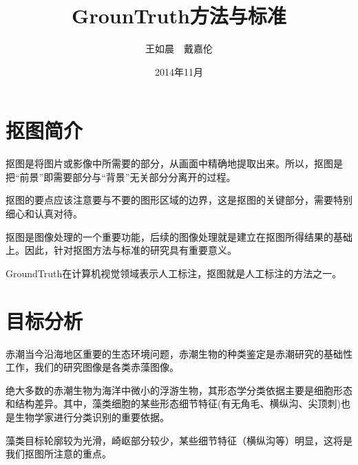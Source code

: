 \documentclass[12pt]{article}
\begin{document}
\title{\vspace{-2em}GrounTruth方法与标准\vspace{-0.7em}}
\author{王如晨　戴嘉伦}
\date{\vspace{-0.7em}2014年11月\vspace{-0.7em}}
\maketitle\thispagestyle{fancy}

\section{抠图简介}
\begin{enumerate*}
\item 抠图是将图片或影像中所需要的部分，从画面中精确地提取出来。所以，抠图是把“前景”即需要部分与“背景”无关部分分离开的过程。
\item 抠图的要点应该注意要与不要的图形区域的边界，这是抠图的关键部分，需要特别细心和认真对待。
\item 抠图是图像处理的一个重要功能，后续的图像处理就是建立在抠图所得结果的基础上。因此，针对抠图方法与标准的研究具有重要意义。
\item GroundTruth在计算机视觉领域表示人工标注，抠图就是人工标注的方法之一。
\end{enumerate*}



\section{目标分析}
\begin{itemize*}
\item 赤潮当今沿海地区重要的生态环境问题，赤潮生物的种类鉴定是赤潮研究的基础性工作，我们的研究图像是各类赤藻图像。
\item 绝大多数的赤潮生物为海洋中微小的浮游生物，其形态学分类依据主要是细胞形态和结构差异。其中，藻类细胞的某些形态细节特征(有无角毛、横纵沟、尖顶刺)也是生物学家进行分类识别的重要依据。
\item 藻类目标轮廓较为光滑，崎岖部分较少，某些细节特征（横纵沟等）明显，这将是我们抠图所注意的重点。
\end{itemize*}
\end{document}
